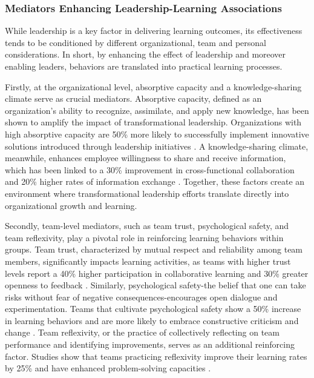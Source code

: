 \subsubsection{Mediators Enhancing Leadership-Learning Associations}

While leadership is a key factor in delivering learning outcomes, its effectiveness tends to be
conditioned by different organizational, team and personal considerations. In short, by enhancing
the effect of leadership and moreover enabling leaders, behaviors are translated into practical
learning processes.

Firstly, at the organizational level, absorptive capacity and a knowledge-sharing climate serve as
crucial mediators. Absorptive capacity, defined as an organization's ability to recognize,
assimilate, and apply new knowledge, has been shown to amplify the impact of transformational
leadership. Organizations with high absorptive capacity are 50\% more likely to successfully
implement innovative solutions introduced through leadership initiatives \cite{Imran}. A
knowledge-sharing climate, meanwhile, enhances employee willingness to share and receive
information, which has been linked to a 30\% improvement in cross-functional collaboration and 20\%
higher rates of information exchange \cite{Camps}. Together, these factors create an environment
where transformational leadership efforts translate directly into organizational growth and
learning.

Secondly, team-level mediators, such as team trust, psychological safety, and team reflexivity, play
a pivotal role in reinforcing learning behaviors within groups. Team trust, characterized by mutual
respect and reliability among team members, significantly impacts learning activities, as teams with
higher trust levels report a 40\% higher participation in collaborative learning and 30\% greater
openness to feedback \cite{Hirak}. Similarly, psychological safety-the belief that one can take
risks without fear of negative consequences-encourages open dialogue and experimentation. Teams that
cultivate psychological safety show a 50\% increase in learning behaviors and are more likely to
embrace constructive criticism and change \cite{Carmeli}. Team reflexivity, or the practice of
collectively reflecting on team performance and identifying improvements, serves as an additional
reinforcing factor. Studies show that teams practicing reflexivity improve their learning rates by
25\% and have enhanced problem-solving capacities \cite{Matsuo}.


